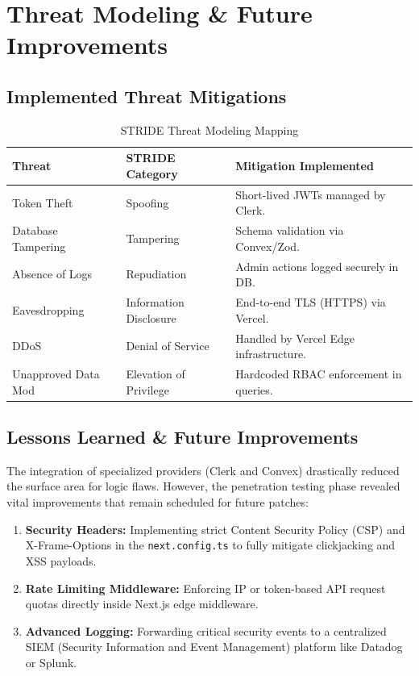 \documentclass[12pt,a4paper]{report}
\begin{document}
\chapter{Threat Modeling \& Future Improvements}

\section{Implemented Threat Mitigations}
\begin{table}[H]
    \centering
    \renewcommand{\arraystretch}{1.5}
    \begin{tabularx}{\textwidth}{|l|l|X|}
        \hline
        \textbf{Threat} & \textbf{STRIDE Category} & \textbf{Mitigation Implemented} \\
        \hline
        Token Theft & Spoofing & Short-lived JWTs managed by Clerk. \\
        \hline
        Database Tampering & Tampering & Schema validation via Convex/Zod. \\
        \hline
        Absence of Logs & Repudiation & Admin actions logged securely in DB. \\
        \hline
        Eavesdropping & Information Disclosure & End-to-end TLS (HTTPS) via Vercel. \\
        \hline
        DDoS & Denial of Service & Handled by Vercel Edge infrastructure. \\
        \hline
        Unapproved Data Mod & Elevation of Privilege & Hardcoded RBAC enforcement in queries. \\
        \hline
    \end{tabularx}
    \caption{STRIDE Threat Modeling Mapping}
    \label{tab:threat_model}
\end{table}

\section{Lessons Learned \& Future Improvements}
The integration of specialized providers (Clerk and Convex) drastically reduced the surface area for logic flaws. However, the penetration testing phase revealed vital improvements that remain scheduled for future patches:
\begin{enumerate}
    \item \textbf{Security Headers:} Implementing strict Content Security Policy (CSP) and X-Frame-Options in the \texttt{next.config.ts} to fully mitigate clickjacking and XSS payloads.
    \item \textbf{Rate Limiting Middleware:} Enforcing IP or token-based API request quotas directly inside Next.js edge middleware.
    \item \textbf{Advanced Logging:} Forwarding critical security events to a centralized SIEM (Security Information and Event Management) platform like Datadog or Splunk.
\end{enumerate}
\end{document}
